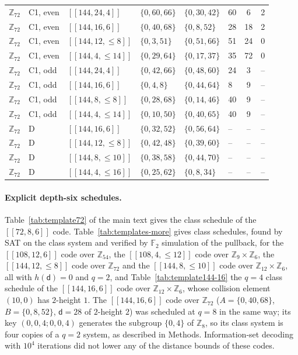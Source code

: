 \documentclass[reprint,twocolumn,superscriptaddress,nofootinbib]{revtex4-2}
\theoremstyle{plain}
\newcommand{\F}{\mathbb{F}_2}
\newcommand{\col}{\mathsf{d}}          %
\begin{document}
\begin{table}[!t]
\begin{ruledtabular}
\begin{tabular}{llllllcc}
$\mathbb{Z}_{72}$ & C1, even & $[[144,24,4]]$ & $\{0,60,66\}$ & $\{0,30,42\}$ & 60 & 6 & 2 \\
$\mathbb{Z}_{72}$ & C1, even & $[[144,16,6]]$ & $\{0,40,68\}$ & $\{0,8,52\}$ & 28 & 18 & 2 \\
$\mathbb{Z}_{72}$ & C1, even & $[[144,12,\le8]]$ & $\{0,3,51\}$ & $\{0,51,66\}$ & 51 & 24 & 0 \\
$\mathbb{Z}_{72}$ & C1, even & $[[144,4,\le14]]$ & $\{0,29,64\}$ & $\{0,17,37\}$ & 35 & 72 & 0 \\
$\mathbb{Z}_{72}$ & C1, odd & $[[144,24,4]]$ & $\{0,42,66\}$ & $\{0,48,60\}$ & 24 & 3 & -- \\
$\mathbb{Z}_{72}$ & C1, odd & $[[144,16,6]]$ & $\{0,4,8\}$ & $\{0,44,64\}$ & 8 & 9 & -- \\
$\mathbb{Z}_{72}$ & C1, odd & $[[144,8,\le8]]$ & $\{0,28,68\}$ & $\{0,14,46\}$ & 40 & 9 & -- \\
$\mathbb{Z}_{72}$ & C1, odd & $[[144,4,\le14]]$ & $\{0,10,50\}$ & $\{0,40,65\}$ & 40 & 9 & -- \\
$\mathbb{Z}_{72}$ & D & $[[144,16,6]]$ & $\{0,32,52\}$ & $\{0,56,64\}$ & -- & -- & -- \\
$\mathbb{Z}_{72}$ & D & $[[144,12,\le8]]$ & $\{0,42,48\}$ & $\{0,39,60\}$ & -- & -- & -- \\
$\mathbb{Z}_{72}$ & D & $[[144,8,\le10]]$ & $\{0,38,58\}$ & $\{0,44,70\}$ & -- & -- & -- \\
$\mathbb{Z}_{72}$ & D & $[[144,4,\le16]]$ & $\{0,25,62\}$ & $\{0,8,34\}$ & -- & -- & -- \\
\end{tabular}
\end{ruledtabular}
\end{table}

\paragraph*{Explicit depth-six schedules.}
Table~\ref{tab:template72} of the main text gives the class schedule of the
$[[72,8,6]]$ code. Table~\ref{tab:templates-more} gives class schedules,
found by SAT on the class system and verified by $\F$ simulation of the
pullback, for the $[[108,12,6]]$ code over $\mathbb{Z}_{54}$, the
$[[108,4,\le12]]$ code over $\mathbb{Z}_9\times\mathbb{Z}_6$, the
$[[144,12,\le8]]$ code over $\mathbb{Z}_{72}$ and the $[[144,8,\le10]]$
code over $\mathbb{Z}_{12}\times\mathbb{Z}_6$, all with $h(\col)=0$ and
$q=2$, and Table~\ref{tab:template144-16} the $q=4$ class schedule of the
$[[144,16,6]]$ code over $\mathbb{Z}_{12}\times\mathbb{Z}_6$, whose
collision element $(10,0)$ has $2$-height $1$. The $[[144,16,6]]$ code
over $\mathbb{Z}_{72}$ ($A=\{0,40,68\}$, $B=\{0,8,52\}$, $\col=28$ of
$2$-height $2$) was scheduled at $q=8$ in the same way; its key
$(0,0,4;0,0,4)$ generates the subgroup $\{0,4\}$ of $\mathbb{Z}_8$, so its
class system is four copies of a $q=2$ system, as described in Methods.
Information-set decoding with $10^4$ iterations did not lower any of the
distance bounds of these codes.
\end{document}
